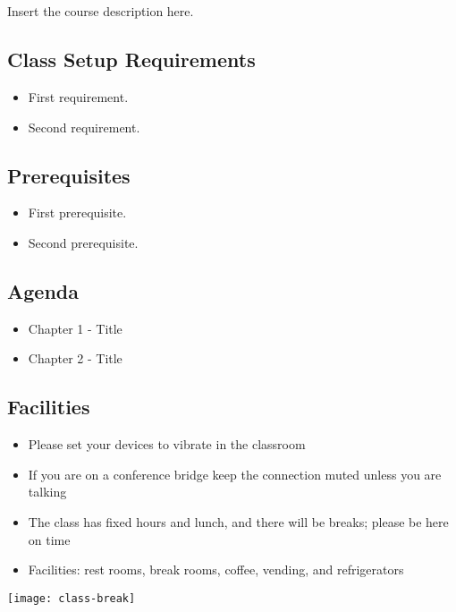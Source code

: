 \documentclass[../workbook]{subfiles}
\begin{document}

\section*{\bookcoursenumber \bookmajortitle}

Insert the course description here.



\subsection*{Class Setup Requirements}

\begin{itemize}
    \item First requirement.
    \item Second requirement.
\end{itemize}



\subsection*{Prerequisites}

\begin{itemize}
    \item First prerequisite.
    \item Second prerequisite.
\end{itemize}



\subsection*{Agenda}

\begin{itemize}
    \item Chapter 1 - Title
    \item Chapter 2 - Title
\end{itemize}



\subsection*{Facilities}

\begin{itemize}
    \item Please set your devices to vibrate in the classroom
    \item If you are on a conference bridge keep the connection muted unless you are talking
    \item The class has fixed hours and lunch, and there will be breaks; please be here on time
    \item Facilities: rest rooms, break rooms, coffee, vending, and refrigerators
\end{itemize}

\edef\measurepage{\the\dimexpr\pagegoal-\pagetotal-\baselineskip\relax}
\mbox{}\hfill\texttt{[image: class-break]}
\end{document}
